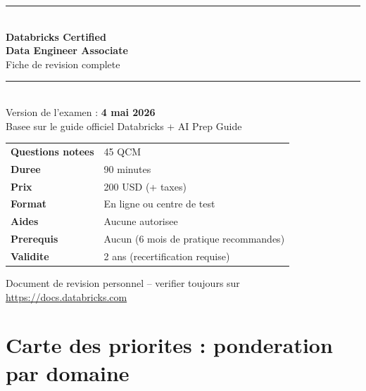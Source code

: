 \documentclass[11pt,a4paper]{article}
\begin{document}
\begin{titlepage}
\centering
\vspace*{2cm}
{\color{databricksred}\rule{\textwidth}{2pt}}\\[0.5cm]
{\Huge\bfseries Databricks Certified\\[0.3cm] Data Engineer Associate}\\[0.4cm]
{\LARGE Fiche de revision complete}\\[0.3cm]
{\color{databricksred}\rule{\textwidth}{2pt}}\\[1.2cm]

{\large Version de l'examen : \textbf{4 mai 2026}}\\[0.3cm]
{\large Basee sur le guide officiel Databricks + AI Prep Guide}\\[2cm]

\begin{tcolorbox}[width=0.8\textwidth,colback=lightgray,colframe=databricksred,
  title=\textbf{En bref},fonttitle=\large]
\begin{tabular}{@{}ll@{}}
\textbf{Questions notees} & 45 QCM \\
\textbf{Duree} & 90 minutes \\
\textbf{Prix} & 200 USD (+ taxes) \\
\textbf{Format} & En ligne ou centre de test \\
\textbf{Aides} & Aucune autorisee \\
\textbf{Prerequis} & Aucun (6 mois de pratique recommandes) \\
\textbf{Validite} & 2 ans (recertification requise) \\
\end{tabular}
\end{tcolorbox}

\vfill
{\small Document de revision personnel -- verifier toujours sur \url{https://docs.databricks.com}}
\end{titlepage}

\tableofcontents
\newpage

\section*{Carte des priorites : ponderation par domaine}
\end{document}

